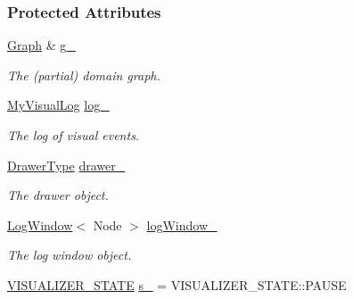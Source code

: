\subsubsection*{Protected Attributes}
\begin{DoxyCompactItemize}
\item 
\hyperlink{structVisualizerData_a22f7b99d8e45a9bcc56771efd611f5e3}{Graph} \& \hyperlink{structVisualizerData_ad29f4888d23c453ea6f2540d94f7fe01}{g\+\_\+}\hypertarget{structVisualizerData_ad29f4888d23c453ea6f2540d94f7fe01}{}\label{structVisualizerData_ad29f4888d23c453ea6f2540d94f7fe01}

\begin{DoxyCompactList}\small\item\em The (partial) domain graph. \end{DoxyCompactList}\item 
\hyperlink{structVisualizerData_a6cd4b3f0a572ec341c19cb0c0dc3751a}{My\+Visual\+Log} \hyperlink{structVisualizerData_a5160457aca0b3f3931e58dc67b4c5ba6}{log\+\_\+}\hypertarget{structVisualizerData_a5160457aca0b3f3931e58dc67b4c5ba6}{}\label{structVisualizerData_a5160457aca0b3f3931e58dc67b4c5ba6}

\begin{DoxyCompactList}\small\item\em The log of visual events. \end{DoxyCompactList}\item 
\hyperlink{structVisualizerData_ae68cf5e12f7a5c784c906194ca822f05}{Drawer\+Type} \hyperlink{structVisualizerData_a5d12c4cbef44128c9e84fe1872674e7c}{drawer\+\_\+}\hypertarget{structVisualizerData_a5d12c4cbef44128c9e84fe1872674e7c}{}\label{structVisualizerData_a5d12c4cbef44128c9e84fe1872674e7c}

\begin{DoxyCompactList}\small\item\em The drawer object. \end{DoxyCompactList}\item 
\hyperlink{structLogWindow}{Log\+Window}$<$ Node $>$ \hyperlink{structVisualizerData_abe347fa0528aee12a74a70ec4a2bdc33}{log\+Window\+\_\+}\hypertarget{structVisualizerData_abe347fa0528aee12a74a70ec4a2bdc33}{}\label{structVisualizerData_abe347fa0528aee12a74a70ec4a2bdc33}

\begin{DoxyCompactList}\small\item\em The log window object. \end{DoxyCompactList}\item 
\hyperlink{structVisualizerData_a2384b80db05920ce2bdddab4fad53a47}{V\+I\+S\+U\+A\+L\+I\+Z\+E\+R\+\_\+\+S\+T\+A\+TE} \hyperlink{structVisualizerData_a39f92fa69cbedf864549aa7e91639019}{s\+\_\+} = V\+I\+S\+U\+A\+L\+I\+Z\+E\+R\+\_\+\+S\+T\+A\+T\+E\+::\+P\+A\+U\+SE\hypertarget{structVisualizerData_a39f92fa69cbedf864549aa7e91639019}{}\label{structVisualizerData_a39f92fa69cbedf864549aa7e91639019}


\end{DoxyCompactItemize}
